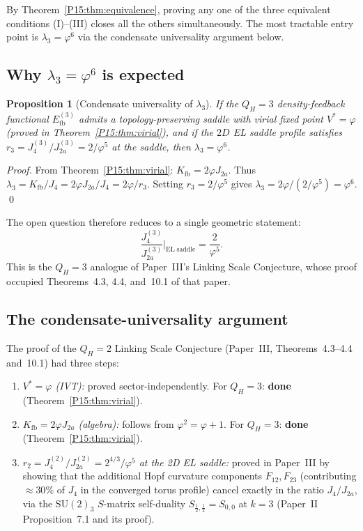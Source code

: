 \documentclass[11pt,a4paper]{article}
\newtheorem{proposition}[theorem]{Proposition}
\theoremstyle{definition}\newtheorem{definition}[theorem]{Definition}
\theoremstyle{remark}
\newcommand{\vp}{\varphi}
\newcommand{\lam}{\lambda}
\newcommand{\Ja}{J_{2a}}
\newcommand{\Jfour}{J_4}
\newcommand{\SU}{\mathrm{SU}}
\newcommand{\Efb}{E_{\mathrm{fb}}}
\newcommand{\Kfb}{K_{\mathrm{fb}}}
\newcommand{\QH}{Q_H}
\begin{document}
By Theorem~\ref{P15:thm:equivalence}, proving any one of the three
equivalent conditions (I)--(III) closes all the others
simultaneously.  The most tractable entry point is
$\lam_3=\vp^6$ via the condensate universality argument below.

\subsection{Why $\lam_3=\vp^6$ is expected}

\begin{proposition}[Condensate universality of $\lam_3$]
\label{P15:prop:lambda3}
If the $\QH=3$ density-feedback functional $\Efb^{(3)}$ admits
a topology-preserving saddle with virial fixed point $V^*=\vp$
(proved in Theorem~\ref{P15:thm:virial}), and if the $2D$ EL saddle
profile satisfies $r_3 = \Jfour^{(3)}/\Ja^{(3)} = 2/\vp^5$
at the saddle, then $\lam_3=\vp^6$.
\end{proposition}

\begin{proof}
From Theorem~\ref{P15:thm:virial}: $\Kfb=2\vp\Ja$.
Thus $\lam_3 = \Kfb/\Jfour = 2\vp\Ja/\Jfour = 2\vp/r_3$.
Setting $r_3 = 2/\vp^5$ gives $\lam_3 = 2\vp/(2/\vp^5)=\vp^6$.
\qed
\end{proof}

\noindent
The open question therefore reduces to a single geometric statement:
\begin{equation}
  \frac{\Jfour^{(3)}}{\Ja^{(3)}}\bigg|_{\mathrm{EL\;saddle}} = \frac{2}{\vp^5}.
  \label{P15:eq:r3_conjecture}
\end{equation}
This is the $\QH=3$ analogue of Paper~III's Linking Scale Conjecture,
whose proof occupied Theorems~4.3, 4.4, and~10.1 of that paper.

\subsection{The condensate-universality argument}

The proof of the $\QH=2$ Linking Scale Conjecture (Paper~III,
Theorems~4.3--4.4 and~10.1) had three steps:
\begin{enumerate}[noitemsep,label=(\alph*)]
\item \emph{$V^*=\vp$ (IVT):} proved sector-independently.
  For $\QH=3$: \textbf{done} (Theorem~\ref{P15:thm:virial}).
\item \emph{$\Kfb=2\vp\Ja$ (algebra):} follows from $\vp^2=\vp+1$.
  For $\QH=3$: \textbf{done} (Theorem~\ref{P15:thm:virial}).
\item \emph{$r_2=J_4^{(2)}/J_{2a}^{(2)}=2^{4/3}/\vp^5$ at the 2D EL saddle:}
  proved in Paper~III by showing that the additional Hopf curvature
  components $F_{12},F_{23}$ (contributing $\approx30\%$ of $J_4$
  in the converged torus profile) cancel exactly in the ratio
  $J_4/J_{2a}$, via the $\SU(2)_3$ $S$-matrix self-duality
  $S_{\frac12,\frac12}=S_{0,0}$ at $k=3$
  (Paper~II Proposition~7.1 and its proof).
\end{enumerate}
\end{document}
